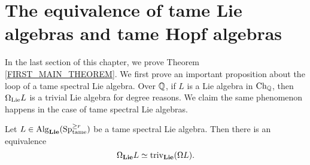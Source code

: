 



\section{The equivalence of tame Lie algebras and tame Hopf algebras}
\label{Proof of the first main Theorem}
In the last section of this chapter, we prove Theorem \ref{FIRST_MAIN_THEOREM}.
We first prove an important proposition about the loop of a tame spectral Lie algebra.
Over ${\mathbb{Q}}$, if $L$ is a Lie algebra in $\operatorname{Ch}_{{\mathbb{Q}}}$, then $\Omega_{\operatorname{Lie}}L$ is a trivial Lie algebra for degree reasons.
We claim the same phenomenon happens in the case of tame spectral Lie algebras.

\begin{proposition}
\label{Triviality of loop of an O-algebra}
	Let $L\in \operatorname{Alg}_{\mathbf{Lie}}(\operatorname{Sp}^{\geq r}_{\operatorname{\operatorname{tame}}}) $ be a tame spectral Lie algebra.
	Then there is an equivalence
	$$
	\Omega_{\mathbf{Lie}} L\simeq \operatorname{triv}_{\mathbf{Lie}}(\Omega L).
	$$ 
\end{proposition}

